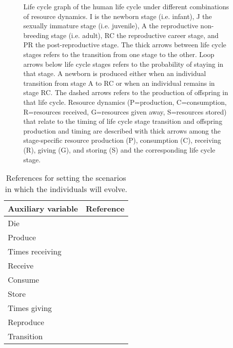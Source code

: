 \documentclass{article}
\begin{document}
\begin{sidewaysfigure}
\begin{figure}[H]
\caption{Life cycle graph of the human life cycle under different combinations of resource dynamics. I is the newborn stage (i.e. infant), J the sexually immature stage (i.e. juvenile), A the reproductive non-breeding stage (i.e. adult), RC the reproductive career stage, and PR the post-reproductive stage. The thick arrows between life cycle stages refers to the transition from one stage to the other. Loop arrows below life cycle stages refers to the probability of staying in that stage. A newborn is produced either when an individual transition from stage A to RC or when an individual remains in stage RC. The dashed arrows refers to the production of offspring in that life cycle. Resource dynamics (P=production, C=consumption, R=resources received, G=resources given away, S=resources stored) that relate to the timing of life cycle stage transition and offspring production and timing are described with thick arrows among the stage-specific resource production (P), consumption (C), receiving (R), giving (G), and storing (S) and the corresponding life cycle stage.}
    \label{fig:2}
\end{figure}
\end{sidewaysfigure}

\begin{table}[H]
    \centering
    \begin{tabular}{ l r }
    \hline
    Auxiliary variable & Reference \\ 
    \hline
    Die & \cite{gurven2007longevity} \\  
    Produce & \cite{koster2020life} \\  
    Times receiving & \cite{gurven2004give} \\  
    Receive & \cite{gurven2004give} \\  
    Consume & \cite{kaplan2000theory} \\  
    Store & \cite{bowles2011cultivation} \\  
    Times giving & \cite{gurven2004give} \\  
    Reproduce & \cite{wood2017dynamics} \\  
    Transition & \cite{ellison2017reproductive,wood2017dynamics,laisk2019demographic} \\
    \hline
    \end{tabular}
    \caption{References for setting the scenarios in which the individuals will evolve.}
    \label{tab:1}
\end{table}



\end{document}
